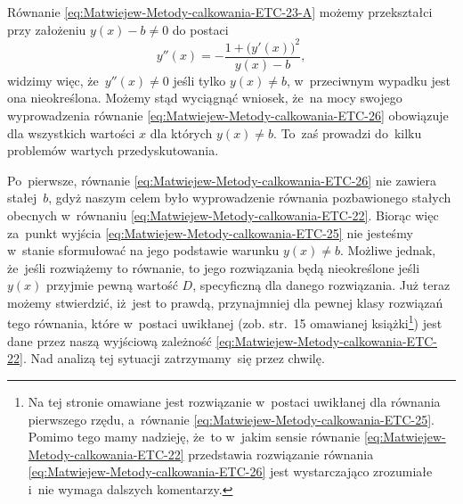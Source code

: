 \documentclass[a4paper,11pt]{article}
\numberwithin{equation}{section}
\begin{document}
Równanie \eqref{eq:Matwiejew-Metody-calkowania-ETC-23-A} możemy przekształci
przy założeniu $y( x ) - b \neq 0$ do postaci
\begin{equation}
  \label{eq:Uwagi-do-konkrentych-stron-06}
  y''( x ) =
  -\frac{ 1 + \big( y'( x ) \big)^{ 2 } }{ y( x ) - b },
\end{equation}
widzimy więc, że~$y''( x ) \neq 0$ jeśli tylko $y( x ) \neq b$, w~przeciwnym
wypadku jest ona nieokreślona. Możemy stąd wyciągnąć wniosek,
że~na mocy swojego wyprowadzenia równanie
\eqref{eq:Matwiejew-Metody-calkowania-ETC-26} obowiązuje dla wszystkich
wartości $x$ dla których $y( x ) \neq b$. To~zaś prowadzi do~kilku problemów
wartych przedyskutowania.

Po~pierwsze, równanie \eqref{eq:Matwiejew-Metody-calkowania-ETC-26} nie
zawiera stałej~$b$, gdyż naszym celem było wyprowadzenie równania
pozbawionego stałych obecnych w~równaniu
\eqref{eq:Matwiejew-Metody-calkowania-ETC-22}. Biorąc więc za~punkt wyjścia
\eqref{eq:Matwiejew-Metody-calkowania-ETC-25} nie jesteśmy w~stanie
sformułować na jego podstawie warunku $y( x ) \neq b$. Możliwe jednak, że~jeśli
rozwiążemy to równanie, to jego rozwiązania będą nieokreślone jeśli $y( x )$
przyjmie pewną wartość $D$, specyficzną dla danego rozwiązania. Już teraz
możemy stwierdzić, iż~jest to prawdą, przynajmniej dla pewnej klasy
rozwiązań tego równania, które w~postaci uwikłanej (zob. str.~15 omawianej
książki\footnote{Na tej stronie omawiane jest rozwiązanie w~postaci
  uwikłanej dla równania pierwszego rzędu, a~równanie
  \eqref{eq:Matwiejew-Metody-calkowania-ETC-25}. Pomimo tego mamy nadzieję,
  że~to w~jakim sensie równanie
  \eqref{eq:Matwiejew-Metody-calkowania-ETC-22} przedstawia rozwiązanie
  równania \eqref{eq:Matwiejew-Metody-calkowania-ETC-26} jest wystarczająco
  zrozumiałe i~nie wymaga dalszych komentarzy.}) jest dane przez naszą
wyjściową zależność
\eqref{eq:Matwiejew-Metody-calkowania-ETC-22}. Nad analizą tej sytuacji
zatrzymamy~się przez chwilę.
\end{document}
